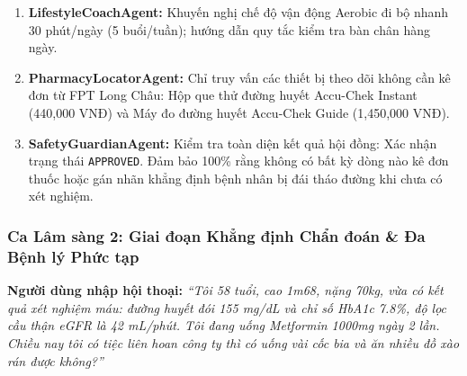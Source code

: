 \documentclass[12pt,a4paper]{article}
\begin{document}
\begin{enumerate}[leftmargin=1.2cm]
    \item \textbf{LifestyleCoachAgent:} Khuyến nghị chế độ vận động Aerobic đi bộ nhanh 30 phút/ngày (5 buổi/tuần); hướng dẫn quy tắc kiểm tra bàn chân hàng ngày.
    \item \textbf{PharmacyLocatorAgent:} Chỉ truy vấn các thiết bị theo dõi không cần kê đơn từ FPT Long Châu: Hộp que thử đường huyết Accu-Chek Instant (440,000 VNĐ) và Máy đo đường huyết Accu-Chek Guide (1,450,000 VNĐ).
    \item \textbf{SafetyGuardianAgent:} Kiểm tra toàn diện kết quả hội đồng: Xác nhận trạng thái \texttt{APPROVED}. Đảm bảo 100\% rằng không có bất kỳ dòng nào kê đơn thuốc hoặc gán nhãn khẳng định bệnh nhân bị đái tháo đường khi chưa có xét nghiệm.
\end{enumerate}

\subsubsection{Ca Lâm sàng 2: Giai đoạn Khẳng định Chẩn đoán \& Đa Bệnh lý Phức tạp}
\begin{tcolorbox}[colback=warnbg,colframe=warnframe,title=Dữ Liệu Đầu Vào Ca Lâm Sàng 2]
\textbf{Người dùng nhập hội thoại:} \textit{“Tôi 58 tuổi, cao 1m68, nặng 70kg, vừa có kết quả xét nghiệm máu: đường huyết đói 155 mg/dL và chỉ số HbA1c 7.8\%, độ lọc cầu thận eGFR là 42 mL/phút. Tôi đang uống Metformin 1000mg ngày 2 lần. Chiều nay tôi có tiệc liên hoan công ty thì có uống vài cốc bia và ăn nhiều đồ xào rán được không?”}
\end{tcolorbox}
\end{document}
